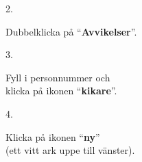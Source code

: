 \documentclass[paper=a5,DIV=15,headinclude,twoside=semi,openany,titlepage=firstiscover]{scrbook}
\begin{document}
\noindent\hrulefill

\vfill
\noindent
\begin{minipage}[t]{0.06\textwidth}
\phantom{1}2.
\end{minipage}%
\begin{minipage}[t]{.49\textwidth}\raggedright
	Dubbelklicka på ``\textbf{Avvikelser}''.
\end{minipage}%
\begin{minipage}[t]{.45\textwidth}
	\hfill{}
\end{minipage}
\vfill

\noindent\hrulefill

\vfill
\noindent
\begin{minipage}[t]{0.06\textwidth}
	\phantom{1}3.
\end{minipage}%
\begin{minipage}[t]{.44\textwidth}\raggedright
	Fyll i personnummer och\\ klicka på ikonen ``\textbf{kikare}''.
\end{minipage}%
\begin{minipage}[t]{.5\textwidth}
	\hfill{}
\end{minipage}
\vfill

\noindent\hrulefill

\vfill
\noindent
\begin{minipage}[t]{0.06\textwidth}
	\phantom{1}4.
\end{minipage}%
\begin{minipage}[t]{.44\textwidth}\raggedright
	Klicka på ikonen ``\textbf{ny}''\\(ett vitt ark uppe till vänster).
\end{minipage}%
\begin{minipage}[t]{.5\textwidth}
	\hfill{}
\end{minipage}
\vfill
\end{document}
